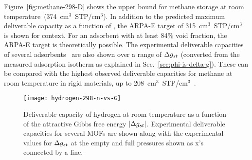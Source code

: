 Figure~\ref{fig:methane-298-D} shows the upper bound for methane storage at room temperature~(374~cm$^3$~STP/cm$^3$). In addition to the predicted maximum deliverable capacity as a function of \gst,
the ARPA-E target of 315~cm$^3$~STP/cm$^3$~\cite{arpaemove} is shown for context. For an adsorbent with at least 84\% void fraction, the ARPA-E target is theoretically possible. The experimental deliverable capacities of several adsorbents~\cite{mason2014evaluating} are also shown over a range of $\Delta g_{st}$ (converted from the measured adsorption isotherm as explained in  Sec.~\ref{sec:phi-is-delta-g}). These can be compared with the highest observed deliverable capacities for methane at room temperature in rigid materials, up to 208~cm$^3$~STP/cm$^3$~\cite{simon2015materials}. 

\begin{figure}
    \centering
    \texttt{[image: hydrogen-298-n-vs-G]}
    \caption{Deliverable capacity of hydrogen at room temperature as a function of the attractive Gibbs free energy $|\Delta g_{st}|$.  Experimental deliverable capacities for several MOFs are shown along with the experimental values for $\Delta g_{st}$ at the empty and full pressures shown as x's connected by a line.}
    \label{fig:hydrogen-298-D}
\end{figure}



